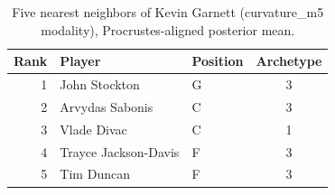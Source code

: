 \begin{table}[htbp]
  \centering\small
  \begin{tabular}{rllc}
    \toprule
    Rank & Player & Position & Archetype \\
    \midrule
    1 & John Stockton & G & 3 \\
    2 & Arvydas Sabonis & C & 3 \\
    3 & Vlade Divac & C & 1 \\
    4 & Trayce Jackson-Davis & F & 3 \\
    5 & Tim Duncan & F & 3 \\
    \bottomrule
  \end{tabular}
  \caption{Five nearest neighbors of Kevin Garnett (curvature_m5 modality), Procrustes-aligned posterior mean.}
  \label{tab:Kevin_Garnett_neighbors_curvature_m5}
\end{table}

